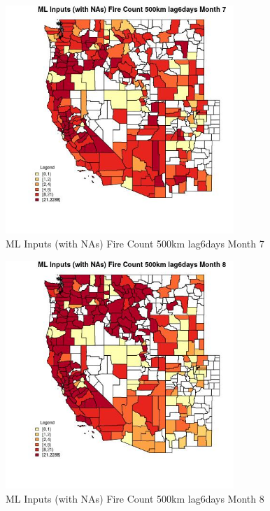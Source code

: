 \clearpage 

\begin{figure} 
\centering  
\includegraphics[width=0.77\textwidth]{Code_Outputs/Report_ML_input_PM25_Step4_part_e_de_duplicated_aves_compiled_2019-05-21wNAs_CountyFire_Count_500km_lag6daysmedianMonth7.jpg} 
\caption{\label{fig:Report_ML_input_PM25_Step4_part_e_de_duplicated_aves_compiled_2019-05-21wNAsCountyFire_Count_500km_lag6daysmedianMonth7}ML Inputs (with NAs) Fire Count 500km lag6days Month 7} 
\end{figure} 
 

\begin{figure} 
\centering  
\includegraphics[width=0.77\textwidth]{Code_Outputs/Report_ML_input_PM25_Step4_part_e_de_duplicated_aves_compiled_2019-05-21wNAs_CountyFire_Count_500km_lag6daysmedianMonth8.jpg} 
\caption{\label{fig:Report_ML_input_PM25_Step4_part_e_de_duplicated_aves_compiled_2019-05-21wNAsCountyFire_Count_500km_lag6daysmedianMonth8}ML Inputs (with NAs) Fire Count 500km lag6days Month 8} 
\end{figure} 
 

